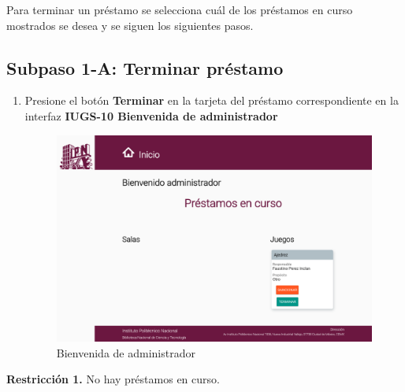 Para terminar un préstamo se selecciona cuál de los préstamos en curso mostrados se desea y se siguen los siguientes pasos.
\subsection{Subpaso 1-A: Terminar préstamo}
\begin{enumerate}
	\item Presione el botón \textbf{Terminar} en la tarjeta del préstamo 
		correspondiente en la interfaz 
		\textbf{IUGS-10 Bienvenida de administrador}
	\begin{figure}[hbtp]
	\includegraphics[scale=0.3]{images/Interfaz/IUGS-10 Bienvenida de administrador.png}
	\caption{Bienvenida de administrador}
	\end{figure}
\end{enumerate}

\textbf{Restricción 1.} No hay préstamos en curso. 
